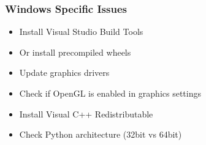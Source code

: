 \documentclass[a4paper,10pt,english,openany,oneside]{sphinxmanual}
\begin{document}
\subsubsection{Windows Specific Issues}
\label{\detokenize{installation:windows-specific-issues}}\begin{description}
\begin{itemize}
\item {} 
\sphinxAtStartPar
Install Visual Studio Build Tools

\item {} 
\sphinxAtStartPar
Or install pre\sphinxhyphen{}compiled wheels

\end{itemize}

\begin{itemize}
\item {} 
\sphinxAtStartPar
Update graphics drivers

\item {} 
\sphinxAtStartPar
Check if OpenGL is enabled in graphics settings

\end{itemize}

\begin{itemize}
\item {} 
\sphinxAtStartPar
Install Visual C++ Redistributable

\item {} 
\sphinxAtStartPar
Check Python architecture (32\sphinxhyphen{}bit vs 64\sphinxhyphen{}bit)

\end{itemize}

\end{description}
\end{document}

